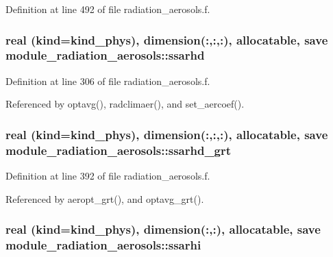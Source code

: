 Definition at line 492 of file radiation\+\_\+aerosols.\+f.

\subsubsection[{\texorpdfstring{ssarhd}{ssarhd}}]{\setlength{\rightskip}{0pt plus 5cm}real (kind=kind\+\_\+phys), dimension(\+:,\+:,\+:), allocatable, save module\+\_\+radiation\+\_\+aerosols\+::ssarhd\hspace{0.3cm}{\ttfamily [private]}}\hypertarget{group__module__radiation__aerosols_gac0714d386ee3dc2ca7f6692905566274}{}\label{group__module__radiation__aerosols_gac0714d386ee3dc2ca7f6692905566274}


Definition at line 306 of file radiation\+\_\+aerosols.\+f.



Referenced by optavg(), radclimaer(), and set\+\_\+aercoef().

\subsubsection[{\texorpdfstring{ssarhd\+\_\+grt}{ssarhd_grt}}]{\setlength{\rightskip}{0pt plus 5cm}real (kind=kind\+\_\+phys), dimension(\+:,\+:,\+:), allocatable, save module\+\_\+radiation\+\_\+aerosols\+::ssarhd\+\_\+grt\hspace{0.3cm}{\ttfamily [private]}}\hypertarget{group__module__radiation__aerosols_ga4aa91ab1d0b9d71c704dc565ef4704bf}{}\label{group__module__radiation__aerosols_ga4aa91ab1d0b9d71c704dc565ef4704bf}


Definition at line 392 of file radiation\+\_\+aerosols.\+f.



Referenced by aeropt\+\_\+grt(), and optavg\+\_\+grt().

\subsubsection[{\texorpdfstring{ssarhi}{ssarhi}}]{\setlength{\rightskip}{0pt plus 5cm}real (kind=kind\+\_\+phys), dimension(\+:,\+:), allocatable, save module\+\_\+radiation\+\_\+aerosols\+::ssarhi\hspace{0.3cm}{\ttfamily [private]}}\hypertarget{group__module__radiation__aerosols_gae4e1ead8bb34371c2d9f1b428846c10c}{}\label{group__module__radiation__aerosols_gae4e1ead8bb34371c2d9f1b428846c10c}


